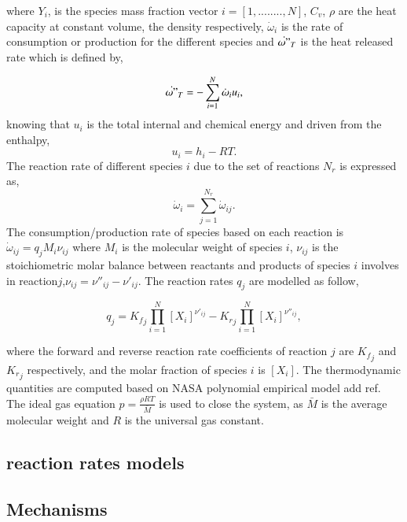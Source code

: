 \documentclass[preprint,review,12pt]{elsarticle}
\begin{document}
where $Y_i$, is the species mass fraction vector $i=[1, ........, N]	$, $C_v$, $\rho$ are the heat capacity at constant volume, the density respectively, $\dot{\omega}_i$ is the rate of consumption or production for the different species and  $\dot{\omega"}_T$ is the heat released rate which is defined by,

\begin{equation}
\label{eq:EST}
\dot{\omega"}_T=-\sum_{i=1}^{N} \dot{\omega}_i u_i,
\end{equation} 
knowing that $u_i$ is the total internal and chemical energy and driven from the enthalpy,
\begin{equation}
u_i=h_i-R T.
\end{equation} 
The reaction rate of different species $i$ due to the set of reactions $N_r$ is expressed as, 
\begin{equation}
\label{eq:SST}
\dot{\omega}_i=\sum_{j=1}^{N_r} \dot{\omega}_{ij}.
\end{equation}     
The consumption/production rate of species based on each reaction is $\dot{\omega}_{ij}= q_j {M}_i {\nu}_{ij} $ where $M_i$ is the molecular weight of species $i$, $ {\nu}_{ij}$ is the stoichiometric molar balance between reactants and products of species $i$ involves in reaction$j$,$ {\nu}_{ij}= {\nu''}_{ij}- {\nu'}_{ij}$. The reaction rates $q_j$ are modelled as follow,
 
 \begin{equation}
 q_j={K_f}_j \prod_{i=1}^{N}[X_i]^{{\nu'}_{ij}}-{K_r}_j \prod_{i=1}^{N}[X_i]^{{\nu''}_{ij}},
 \end{equation}

where the forward and reverse reaction rate coefficients of reaction $j$ are ${K_f}_j$ and ${K_r}_j$ respectively, and the molar fraction of species $i$ is $[X_i]$. The thermodynamic quantities are computed based on NASA polynomial empirical model {\color{red} add ref}. The ideal gas equation $p=\frac{\rho R T}{\bar{M}}$ is used to close the system, as $\bar{M}$ is the average molecular weight and $R $ is the universal gas constant. 
\subsection{reaction rates models}



\subsection{Mechanisms}
\end{document}
